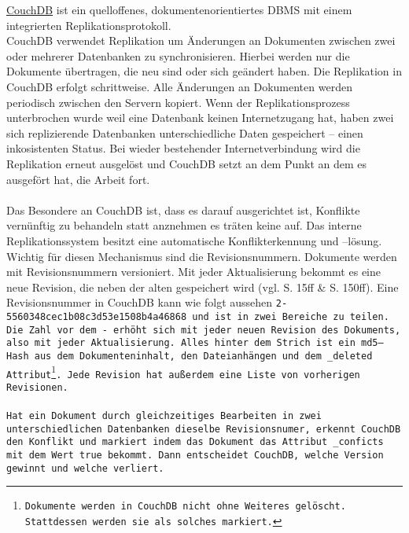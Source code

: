 \hyperref[chap:couch]{CouchDB} ist ein quelloffenes, dokumentenorientiertes \gls{DBMS} mit einem integrierten Replikationsprotokoll.\\
CouchDB verwendet Replikation um Änderungen an Dokumenten zwischen zwei oder mehrerer Datenbanken zu synchronisieren.
Hierbei werden nur die Dokumente übertragen, die neu sind oder sich geändert haben.
Die Replikation in CouchDB erfolgt schrittweise. Alle Änderungen an Dokumenten werden periodisch zwischen den Servern kopiert.
Wenn der Replikationsprozess unterbrochen wurde weil eine Datenbank keinen Internetzugang hat, haben zwei sich replizierende Datenbanken unterschiedliche Daten gespeichert -- einen inkosistenten Status.
Bei wieder bestehender Internetverbindung wird die Replikation erneut ausgelöst und CouchDB setzt an dem Punkt an dem es ausgefört hat, die Arbeit fort.\\\\
%
Das Besondere an CouchDB ist, dass es darauf ausgerichtet ist, Konflikte vernünftig zu behandeln statt anznehmen es träten keine auf.
Das interne Replikationssystem besitzt eine automatische Konflikterkennung und --lösung.\\
Wichtig für diesen Mechanismus sind die Revisionsnummern.
Dokumente werden mit Revisionsnummern versioniert. Mit jeder Aktualisierung bekommt es eine neue Revision, die neben der alten gespeichert wird (vgl. \cite{couchDB} S. 15ff \& S. 150ff). 
Eine Revisionsnummer in CouchDB kann wie folgt aussehen \tt{2-5560348cec1b08c3d53e1508b4a46868} und ist in zwei Bereiche zu teilen. Die Zahl vor dem \tt{-} erhöht sich mit jeder neuen Revision des Dokuments, also mit jeder Aktualisierung. Alles hinter dem Strich ist ein md5--\gls{Hash} aus dem Dokumenteninhalt, den Dateianhängen und dem \tt{\_deleted} Attribut\footnote{ Dokumente werden in CouchDB nicht ohne Weiteres gelöscht. Stattdessen werden sie als solches markiert.}. Jede Revision hat außerdem eine Liste von vorherigen Revisionen.\\\\
Hat ein Dokument durch gleichzeitiges Bearbeiten in zwei unterschiedlichen Datenbanken dieselbe Revisionsnumer, erkennt CouchDB den Konflikt und markiert indem das Dokument das Attribut \tt{\_conficts} mit dem Wert \tt{true} bekommt. Dann entscheidet CouchDB, welche Version gewinnt und welche verliert.
